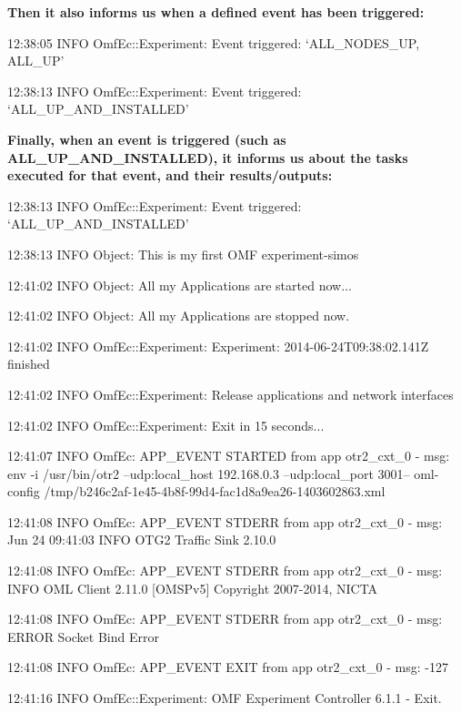\documentclass[letterpaper,10pt,english]{sphinxmanual}
\begin{document}
\begin{DUlineblock}{0em}
\item[] \textbf{Then it also informs us when a defined event has been triggered:}
\end{DUlineblock}

\begin{DUlineblock}{0em}
\item[] 12:38:05 INFO  OmfEc::Experiment: Event triggered: `ALL\_NODES\_UP, ALL\_UP'
\item[] 12:38:13 INFO  OmfEc::Experiment: Event triggered: `ALL\_UP\_AND\_INSTALLED'
\end{DUlineblock}

\begin{DUlineblock}{0em}
\item[] \textbf{Finally, when an event is triggered (such as ALL\_UP\_AND\_INSTALLED), it informs us about the tasks executed for that event, and their       \textbar{} results/outputs:}
\end{DUlineblock}

\begin{DUlineblock}{0em}
\item[] 12:38:13 INFO  OmfEc::Experiment: Event triggered: `ALL\_UP\_AND\_INSTALLED'
\item[] 12:38:13 INFO  Object: This is my first OMF experiment-simos
\item[] 12:41:02 INFO  Object: All my Applications are started now...
\item[] 12:41:02 INFO  Object: All my Applications are stopped now.
\item[] 12:41:02 INFO  OmfEc::Experiment: Experiment: 2014-06-24T09:38:02.141Z finished
\item[] 12:41:02 INFO  OmfEc::Experiment: Release applications and network interfaces
\item[] 12:41:02 INFO  OmfEc::Experiment: Exit in 15 seconds...
\item[] 12:41:07 INFO  OmfEc: APP\_EVENT STARTED from app otr2\_cxt\_0 - msg: env -i /usr/bin/otr2 --udp:local\_host 192.168.0.3 --udp:local\_port 3001-- \textbar{} oml-config /tmp/b246c2af-1e45-4b8f-99d4-fac1d8a9ea26-1403602863.xml
\item[] 12:41:08 INFO  OmfEc: APP\_EVENT STDERR from app otr2\_cxt\_0 - msg: Jun 24 09:41:03 INFO        OTG2 Traffic Sink 2.10.0
\item[] 12:41:08 INFO  OmfEc: APP\_EVENT STDERR from app otr2\_cxt\_0 - msg: INFO        OML Client 2.11.0 {[}OMSPv5{]} Copyright 2007-2014, NICTA
\item[] 12:41:08 INFO  OmfEc: APP\_EVENT STDERR from app otr2\_cxt\_0 - msg: ERROR       Socket Bind Error
\item[] 12:41:08 INFO  OmfEc: APP\_EVENT EXIT from app otr2\_cxt\_0 - msg: -127
\item[] 12:41:16 INFO  OmfEc::Experiment: OMF Experiment Controller 6.1.1 - Exit.
\end{DUlineblock}
\end{document}
